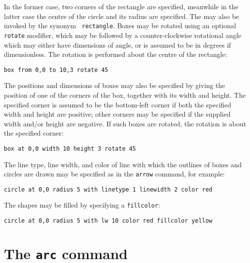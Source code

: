 \noindent In the former case, two corners of the rectangle are specified,
meanwhile in the latter case the centre of the circle and its radius are
specified. The  may also be invoked by the synonym {\tt
rectangle}. Boxes may be rotated using an optional {\tt
rotate} modifier, which may be followed by a counter-clockwise rotational angle
which may either have dimensions of angle, or is assumed to be in degrees if
dimensionless. The rotation is performed about the centre of the rectangle:

\begin{verbatim}
box from 0,0 to 10,3 rotate 45
\end{verbatim}

The positions and dimensions of boxes may also be specified by giving the
position of one of the corners of the box, together with its width and height.
The specified corner is assumed to be the bottom-left corner if both the
specified width and height are positive; other corners may be specified if the
supplied width and/or height are negative. If such boxes are rotated, the
rotation is about the specified corner:

\begin{verbatim}
box at 0,0 width 10 height 3 rotate 45
\end{verbatim}

The line type, line width, and color of line with which the outlines of boxes
and circles are drawn may be specified as in the {\tt arrow} command, for
example:

\begin{verbatim}
circle at 0,0 radius 5 with linetype 1 linewidth 2 color red
\end{verbatim}

\noindent The shapes may be filled by specifying a {\tt fillcolor}:

\begin{verbatim}
circle at 0,0 radius 5 with lw 10 color red fillcolor yellow
\end{verbatim}


\section{The {\tt arc} command}
\label{sec:arc}

